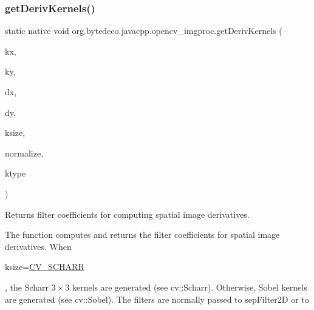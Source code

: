 \subsubsection{\texorpdfstring{get\+Deriv\+Kernels()}{getDerivKernels()}}
{\footnotesize\ttfamily static native void org.\+bytedeco.\+javacpp.\+opencv\+\_\+imgproc.\+get\+Deriv\+Kernels (\begin{DoxyParamCaption}\item[{@By\+Val Mat}]{kx,  }\item[{@By\+Val Mat}]{ky,  }\item[{int}]{dx,  }\item[{int}]{dy,  }\item[{int}]{ksize,  }\item[{@Cast(\char`\"{}bool\char`\"{}) boolean}]{normalize,  }\item[{int}]{ktype }\end{DoxyParamCaption})\hspace{0.3cm}{\ttfamily [static]}}



Returns filter coefficients for computing spatial image derivatives. 

The function computes and returns the filter coefficients for spatial image derivatives. When 
\begin{DoxyCode}
ksize=\hyperlink{group__imgproc__c_gad680d8093fc7352b21881b08002d7698}{CV\_SCHARR} 
\end{DoxyCode}
 , the Scharr $3 \times 3$ kernels are generated (see cv\+::\+Scharr). Otherwise, Sobel kernels are generated (see cv\+::\+Sobel). The filters are normally passed to sep\+Filter2D or to 


